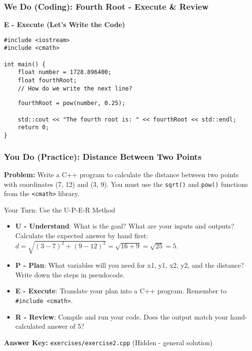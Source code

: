 \documentclass{beamer}
\begin{document}
\begin{frame}[fragile]
\frametitle{We Do (Coding): Fourth Root - Execute \& Review}
\textbf{E - Execute (Let's Write the Code)}
\begin{verbatim}
#include <iostream>
#include <cmath>

int main() {
    float number = 1728.896400;
    float fourthRoot;
    // How do we write the next line?
\end{verbatim}
\pause
\begin{verbatim}
    fourthRoot = pow(number, 0.25);

    std::cout << "The fourth root is: " << fourthRoot << std::endl;
    return 0;
}
\end{verbatim}
\end{frame}

\begin{frame}
\frametitle{You Do (Practice): Distance Between Two Points}
\textbf{Problem:} Write a C++ program to calculate the distance between two points with coordinates \alert{(7, 12)} and \alert{(3, 9)}. You must use the \texttt{sqrt()} and \texttt{pow()} functions from the \texttt{<cmath>} library.

\vfill

\begin{block}{Your Turn: Use the U-P-E-R Method}
\begin{itemize}
    \item \textbf{U - Understand}: What is the goal? What are your inputs and outputs? Calculate the expected answer by hand first: $d = \sqrt{(3-7)^2 + (9-12)^2} = \sqrt{16+9} = \sqrt{25} = 5$.
    \item \textbf{P - Plan}: What variables will you need for x1, y1, x2, y2, and the distance? Write down the steps in pseudocode.
    \item \textbf{E - Execute}: Translate your plan into a C++ program. Remember to \texttt{\#include <cmath>}.
    \item \textbf{R - Review}: Compile and run your code. Does the output match your hand-calculated answer of 5?
\end{itemize}
\end{block}
\vfill
\textbf{Answer Key:} \texttt{exercises/exercise2.cpp} (Hidden - general solution)
\end{frame}
\end{document}
